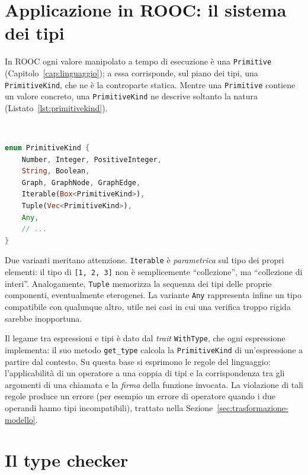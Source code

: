 \section{Applicazione in ROOC: il sistema dei tipi}
\label{sec:tipi-rooc}

In ROOC ogni valore manipolato a tempo di esecuzione è una \texttt{Primitive}
(Capitolo~\ref{cap:linguaggio}); a essa corrisponde, sul piano dei tipi, una
\texttt{PrimitiveKind}, che ne è la controparte statica. Mentre una
\texttt{Primitive} contiene un valore concreto, una \texttt{PrimitiveKind} ne
descrive soltanto la natura (Listato~\ref{lst:primitivekind}).

\

\begin{lstlisting}[language=rust, caption={Versione semplificata dell'enumerazione \texttt{PrimitiveKind}.}, label={lst:primitivekind}]
enum PrimitiveKind {
    Number, Integer, PositiveInteger,
    String, Boolean,
    Graph, GraphNode, GraphEdge,
    Iterable(Box<PrimitiveKind>),
    Tuple(Vec<PrimitiveKind>),
    Any,
    // ...
}
\end{lstlisting}

Due varianti meritano attenzione. \texttt{Iterable} è \emph{parametrica} sul tipo
dei propri elementi: il tipo di \texttt{[1, 2, 3]} non è semplicemente ``collezione'',
ma ``collezione di interi''. Analogamente, \texttt{Tuple} memorizza la sequenza dei
tipi delle proprie componenti, eventualmente eterogenei. La variante \texttt{Any}
rappresenta infine un tipo compatibile con qualunque altro, utile nei casi in cui
una verifica troppo rigida sarebbe inopportuna.

Il legame tra espressioni e tipi è dato dal \emph{trait} \texttt{WithType}, che
ogni espressione implementa: il suo metodo \texttt{get\_type} calcola la
\texttt{PrimitiveKind} di un'espressione a partire dal contesto. Su questa base
si esprimono le regole del linguaggio: l'applicabilità di un operatore a una
coppia di tipi e la corrispondenza tra gli argomenti di una chiamata e la
\emph{firma} della funzione invocata. La violazione di tali regole produce un
errore (per esempio un errore di operatore quando i due operandi hanno tipi
incompatibili), trattato nella Sezione~\ref{sec:trasformazione-modello}.

\section{Il type checker}
\label{sec:type-checker}

